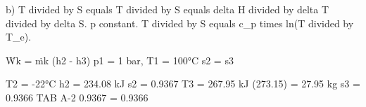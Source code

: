 b) T divided by S equals T divided by S equals delta H divided by delta T divided by delta S.  
p constant.  
T divided by S equals c_p times ln(T divided by T_e).

Ẇk = ṁk (h2 - h3)
p1 = 1 bar, T1 = 100°C
s2 = s3

T2 = -22°C
h2 = 234.08 kJ
s2 = 0.9367
T3 = 267.95 kJ (273.15)
= 27.95 kg
s3 = 0.9366
TAB A-2
0.9367 = 0.9366